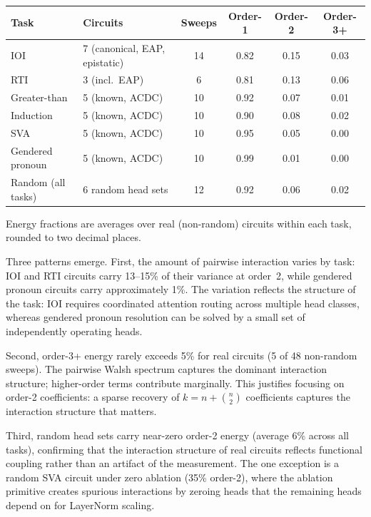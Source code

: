 \documentclass{article}
\begin{document}
{\small
\begin{tabular}{llcccc}
\toprule
Task & Circuits & Sweeps & Order-1 & Order-2 & Order-3+ \\
\midrule
IOI            & 7 (canonical, EAP, epistatic) & 14 & 0.82 & 0.15 & 0.03 \\
RTI            & 3 (incl.\ EAP)               &  6 & 0.81 & 0.13 & 0.06 \\
Greater-than   & 5 (known, ACDC)               & 10 & 0.92 & 0.07 & 0.01 \\
Induction      & 5 (known, ACDC)               & 10 & 0.90 & 0.08 & 0.02 \\
SVA            & 5 (known, ACDC)               & 10 & 0.95 & 0.05 & 0.00 \\
Gendered pronoun & 5 (known, ACDC)             & 10 & 0.99 & 0.01 & 0.00 \\
\midrule
Random (all tasks) & 6 random head sets        & 12 & 0.92 & 0.06 & 0.02 \\
\bottomrule
\end{tabular}
}

\medskip

\noindent Energy fractions are averages over real (non-random) circuits
within each task, rounded to two decimal places.

Three patterns emerge. First, the amount of pairwise interaction varies
by task: IOI and RTI circuits carry 13--15\% of their variance at
order~2, while gendered pronoun circuits carry approximately 1\%. The
variation reflects the structure of the task: IOI requires coordinated
attention routing across multiple head classes, whereas gendered pronoun
resolution can be solved by a small set of independently operating heads.

Second, order-3+ energy rarely exceeds 5\% for real circuits (5 of 48
non-random sweeps). The pairwise Walsh spectrum captures the dominant
interaction structure; higher-order terms contribute marginally. This
justifies focusing on order-2 coefficients: a sparse recovery of
$k = n + \binom{n}{2}$ coefficients captures the interaction structure
that matters.

Third, random head sets carry near-zero order-2 energy (average 6\%
across all tasks), confirming that the interaction structure of real
circuits reflects functional coupling rather than an artifact of the
measurement. The one exception is a random SVA circuit under zero
ablation (35\% order-2), where the ablation primitive creates spurious
interactions by zeroing heads that the remaining heads depend on for
LayerNorm scaling.
\end{document}
